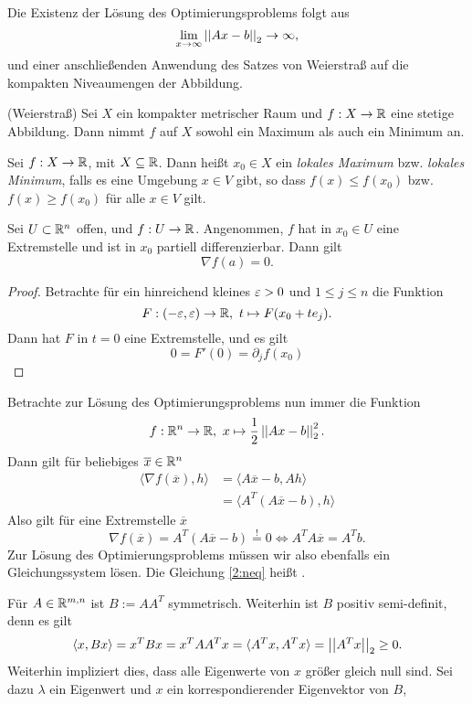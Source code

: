 Die Existenz der Lösung des Optimierungsproblems folgt aus
\[
\lim_{x\to \infty}\left|\left|Ax-b\right|\right|_2\to \infty,
\]
und einer anschließenden Anwendung des Satzes von Weierstraß auf die kompakten Niveaumengen der Abbildung.
\begin{thm}(Weierstraß)\label{2:wei}
  Sei $X$ ein kompakter metrischer Raum und $f:X\to \mathbb{R}$ eine stetige Abbildung. Dann nimmt $f$ auf $X$ sowohl ein Maximum als auch ein Minimum an.
\end{thm}
Sei $f:X\to \mathbb{R}$, mit $X\subseteq \mathbb{R}$. Dann heißt $x_0\in X$ ein \emph{lokales Maximum} bzw. \emph{lokales Minimum}, falls es eine Umgebung $x\in V$ gibt, so dass $f(x)\leq f(x_0)$ bzw. $f(x)\geq f(x_0)$ für alle $x\in V$ gilt. 
\begin{lem}
  Sei $U\subset \mathbb{R}^n$ offen, und $f:U\to \mathbb{R}$. Angenommen, $f$ hat in $x_0\in U$ eine Extremstelle und ist in $x_0$ partiell differenzierbar. Dann gilt
  \[
  \nabla f(a) = 0.
  \]
\end{lem}
\begin{proof}
  Betrachte für ein hinreichend kleines $\varepsilon>0$ und $1\leq j\leq n$ die Funktion
  \[
  F:(-\varepsilon,\varepsilon)\to \mathbb{R},~t\mapsto F(x_0+te_j).
  \]
  Dann hat $F$ in $t=0$ eine Extremstelle, und es gilt
  \[
  0=F'(0)=\partial_jf(x_0)
  \]
\end{proof}
Betrachte zur Lösung des Optimierungsproblems nun immer die Funktion
\[
f:\mathbb{R}^n\to \mathbb{R},~x\mapsto \frac{1}{2}\left|\left|Ax-b\right|\right|_2^2.
\]
Dann gilt für beliebiges $\overline{x}\in \mathbb{R}^n$
\begin{align*}
  \langle \nabla f(\overline{x}),h\rangle &= \langle A\overline{x}-b,Ah\rangle\\
                                         &= \langle A^T(A\overline{x}-b),h\rangle
\end{align*}
Also gilt für eine Extremstelle $\overline{x}$
\begin{equation}\label{2:neq}\tag{NE}
\nabla f(\overline{x}) = A^T(A\overline{x}-b) \overset{!}{=}0 \Longleftrightarrow \boxed{A^TA\overline{x}=A^T b} .
\end{equation}
Zur Lösung des Optimierungsproblems müssen wir also ebenfalls ein Gleichungssystem lösen. Die Gleichung \eqref{2:neq} heißt .\par
\color{purple}
Für $A\in \mathbb{R}^{m,n}$ ist $B:=AA^T$ symmetrisch. Weiterhin ist $B$ positiv semi-definit, denn es gilt
\[
\langle x,Bx\rangle= x^TBx=x^TAA^Tx=\langle A^Tx,A^Tx\rangle =\left|\left|A^Tx\right|\right|_2\geq 0.
\]
Weiterhin impliziert dies, dass alle Eigenwerte von $x$ größer gleich null sind. Sei dazu $\lambda$ ein Eigenwert und $x$ ein korrespondierender Eigenvektor von $B$,

